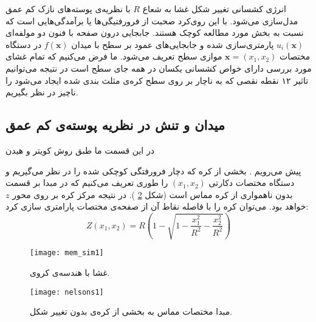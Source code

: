 انرژی کشسانی تغییر شکل غشا به شعاع
 $R$ 
با نظریه‌ی پوسته‌های نازک کم عمق مدل‌سازی می‌شود. با این روی‌کرد صحبت از فرورفتیگی‌ها یا برآمدگی‌هایی است که نسبت به بخش مورد مطالعه کوچک هستند. جابجایی درون صفحه با فنون دو مولفه‌ای 
$u_i(\boldsymbol{x})$ 
پارمتری‌سازی شده و جابجایی‌های عمود بر سطح با میدان 
$f(\boldsymbol{x})$
در دستگاه مختصات
$\boldsymbol{x}=(x_1,x_2)$
موازی سطح تعریف می‌‌شود. ما فرض می‌کنیم که تمام غشای مورد بررسی دارای خواص کشسانی یکسان در همه جای سطح است در نتیجه می‌توانیم تاثیر ۱۲ نقطه نقصی که به ناچار بر روی سطح کره‌ی مثلث بندی شده ایجاد می‌شود را ناچیز در نظر بگیریم.
\subsection{میدان و تنش در نظریه پوسته‌ی کم عمق}
در این قسمت ما طبق روش کویتر
و
هیدن

پیش می‌‌رویم
\cite{Heijden2008WTK}
. بخشی از کره که دچار فرورفتگی کوچکی شده را در نظر می‌گیریم و دستگاه مختصات دکارتی 
$(x_1,x_2)$
را طوری تعریف می‌کنیم که در مبدا بر قسمت بدون ناهمواری از کره مماس است (شکل 
\ref{fig:nelson_figs1}
). در نتیجه مرکز کره بر روی محور 
$z$
خواهد بود. می‌توان کره را با فاصله نقاط آن از صفحه‌ی مختصات پارامتری سازی کرد:
\begin{equation}
Z(x_1,x_2) = R\left(1-\sqrt{1-\frac{x_1^2}{R^2}-\frac{x_2^2}{R^2}}\right)
\label{eq:nelsonS1}
\end{equation}
\begin{figure}[h]
\begin{center}
\texttt{[image: mem\_sim1]}
\caption{
غشا با هندسه‌ی کروی.
}
\label{fig:mem1}
\end{center}
\end{figure}
\begin{figure}[h]
\begin{center}
\texttt{[image: nelsons1]}
\caption{
مبدا مختصات مماس به بخشی از کره‌ی بدون تغییر شکل.ٓ
}
\label{fig:nelson_figs1}
\end{center}
\end{figure}

